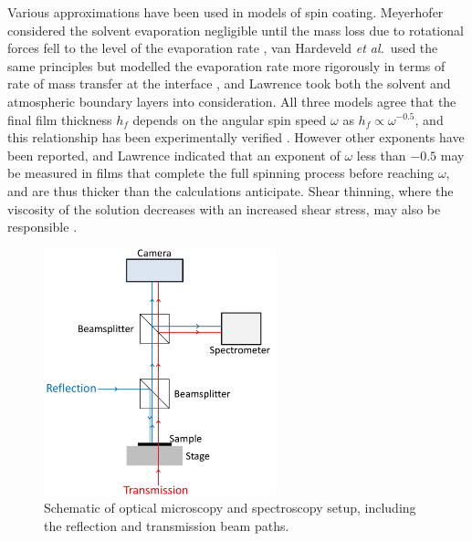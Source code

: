 Various approximations have been used in models of spin coating. Meyerhofer considered the solvent evaporation negligible until the mass loss due to rotational forces fell to the level of the evaporation rate \cite{Meyerhofer1978}, van Hardeveld \textit{et al.\,} used the same principles but modelled the evaporation rate more rigorously in terms of rate of mass transfer at the interface \cite{VanHardeveld1995}, and Lawrence took both the solvent and atmospheric boundary layers into consideration\cite{Lawrence1988}. All three models agree that the final film thickness $h_f$ depends on the angular spin speed $\omega$ as $h_f \propto \omega^{-0.5}$, and this relationship has been experimentally verified \cite{Meyerhofer1978, VanHardeveld1995}. However other exponents have been reported, and Lawrence indicated that an exponent of $\omega$ less than $-0.5$ may be measured in films that complete the full spinning process before reaching $\omega$, and are thus thicker than the calculations anticipate. Shear thinning, where the viscosity of the solution decreases with an increased shear stress, may also be responsible \cite{Lawrence1988}.

\begin{figure}[h!]
\centering    
\includegraphics[width=0.6\textwidth]{Microscope}
\caption{Schematic of optical microscopy and spectroscopy setup, including the reflection and transmission beam paths.}
\label{Microscope}
\end{figure}
